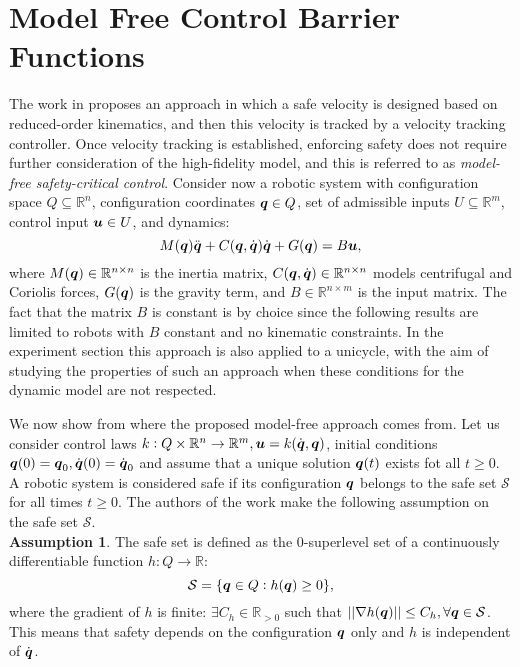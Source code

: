 \section{Model Free Control Barrier Functions}
The work in \cite{mf_cbf} proposes an approach in which a safe velocity is designed based on reduced-order kinematics, and then this velocity is tracked by a velocity tracking controller. Once velocity tracking is established, enforcing safety does not require further consideration of the high-fidelity model, and this is referred to as \textit{model-free safety-critical control}.
Consider now a robotic system with configuration space $Q \subseteq \mathbb{R}^n$, configuration coordinates ${\boldsymbol{q}} \in Q$, set of admissible inputs $U\subseteq \mathbb{R}^m$, control input $\boldsymbol{u} \in U$, and dynamics:
\begin{equation} \label{eq:dynamic model}
    M({\boldsymbol{q}})\ddot{{\boldsymbol{q}}}+C({\boldsymbol{q}},\dot{{\boldsymbol{q}}})\dot{{\boldsymbol{q}}}+G({\boldsymbol{q}})=B\boldsymbol{u},
\end{equation}
where $M({\boldsymbol{q}})\in\mathbb{R}^{n \times n}$ is the inertia matrix, $C({\boldsymbol{q}},\dot{{\boldsymbol{q}}})\in\mathbb{R}^{n \times n}$ models centrifugal and Coriolis forces, $G({\boldsymbol{q}})$ is the gravity term, and $B\in\mathbb{R}^{n \times m}$ is the input matrix. The fact that the matrix $B$ is constant is by choice since the following results are limited to robots with $B$ constant and no kinematic constraints. In the experiment section this approach is also applied to a unicycle, with the aim of studying the properties of such an approach when these conditions for the dynamic model are not respected.

We now show from where the proposed model-free approach comes from. Let us consider control laws $ k:Q\times \mathbb{R}^n \rightarrow \mathbb{R}^m, \boldsymbol{u}=k(\dot{{\boldsymbol{q}}},{\boldsymbol{q}})$, initial conditions ${\boldsymbol{q}}(0) = {\boldsymbol{q}}_0, \dot{{\boldsymbol{q}}}(0)=\dot{{\boldsymbol{q}}}_0$ and assume that a unique solution ${\boldsymbol{q}}(t)$ exists fot all $t \geq 0$. A robotic system is considered safe if its configuration ${\boldsymbol{q}}$ belongs to the safe set $\mathcal{S}$ for all times $t\geq 0$. The authors of the work \cite{mf_cbf} make the following assumption on the safe set $\mathcal{S}$.\\
\textbf{Assumption 1}. The safe set is defined as the 0-superlevel set of a continuously differentiable function $h: Q \rightarrow \mathbb{R}$:
\begin{equation} \label{eq:safe set}
    \mathcal{S} = \{{\boldsymbol{q}} \in Q: h({\boldsymbol{q}})\geq 0 \},
\end{equation}
where the gradient of $h$ is finite: $\exists C_h \in \mathbb{R}_{>0}$ such that $|| \nabla h({\boldsymbol{q}})|| \leq C_h, \forall {\boldsymbol{q}} \in \mathcal{S}$. This means that safety depends on the configuration ${\boldsymbol{q}}$ only and $h$ is independent of $\dot{{\boldsymbol{q}}}$.

